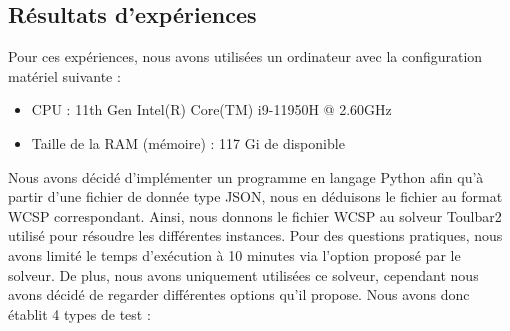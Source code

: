 \documentclass[a4paper, 10pt]{article}
\begin{document}
    \subsection{Résultats d'expériences}
      Pour ces expériences, nous avons utilisées un ordinateur avec la configuration matériel suivante :
      \begin{itemize}
        \item CPU : 11th Gen Intel(R) Core(TM) i9-11950H @ 2.60GHz
        \item Taille de la RAM (mémoire) : 117 Gi de disponible
      \end{itemize}

      Nous avons décidé d'implémenter un programme en langage Python afin qu'à partir d'une fichier de donnée type JSON, nous en déduisons le fichier au format WCSP correspondant. Ainsi, nous donnons le fichier WCSP au solveur Toulbar2 utilisé pour résoudre les différentes instances. Pour des questions pratiques, nous avons limité le temps d'exécution à 10 minutes via l'option proposé par le solveur. De plus, nous avons uniquement utilisées ce solveur, cependant nous avons décidé de regarder différentes options qu'il propose. Nous avons donc établit 4 types de test :
\end{document}
